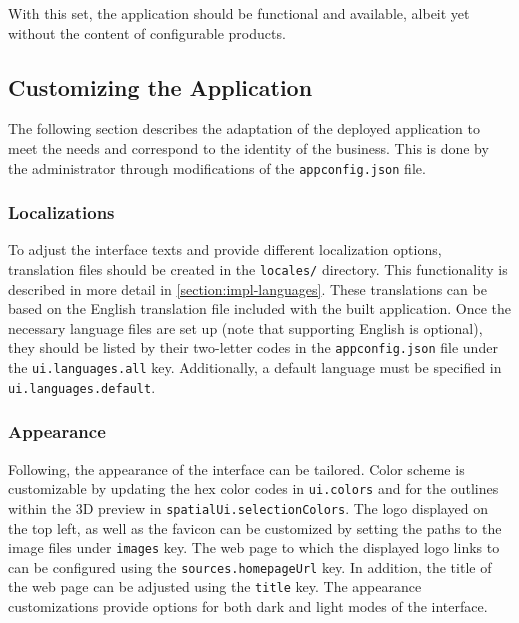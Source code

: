 With this set, the application should be functional and available, albeit yet without the content of configurable products.


\subsection{Customizing the Application}

The following section describes the adaptation of the deployed application to meet the needs and correspond to the identity of the business. This is done by the administrator through modifications of the \texttt{appconfig.json} file.


\subsubsection{Localizations}

To adjust the interface texts and provide different localization options, translation files should be created in the \texttt{locales/} directory. This functionality is described in more detail in \autoref{section:impl-languages}. These translations can be based on the English translation file included with the built application. Once the necessary language files are set up (note that supporting English is optional), they should be listed by their two-letter codes in the \texttt{appconfig.json} file under the \texttt{ui.languages.all} key. Additionally, a default language must be specified in \texttt{ui.languages.default}.


\subsubsection{Appearance}

Following, the appearance of the interface can be tailored. Color scheme is customizable by updating the hex color codes in \texttt{ui.colors} and for the outlines within the 3D preview in \texttt{spatialUi.selectionColors}. The logo displayed on the top left, as well as the favicon can be customized by setting the paths to the image files under \texttt{images} key. The web page to which the displayed logo links to can be configured using the \texttt{sources.homepageUrl} key. In addition, the title of the web page can be adjusted using the \texttt{title} key. The appearance customizations provide options for both dark and light modes of the interface.

